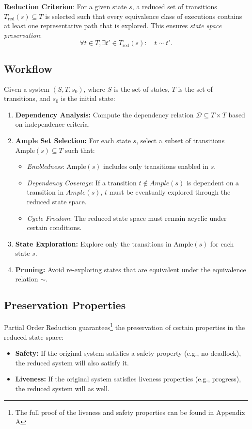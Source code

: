 \textbf{Reduction Criterion}: For a given state \( s \), a reduced set of transitions \( T_{\text{red}}(s) \subseteq T \) is selected such that every equivalence class of executions contains at least one representative path that is explored. This ensures \textit{state space preservation}:
\[
\forall t \in T, \exists t' \in T_{\text{red}}(s): \quad t \sim t'.
\]
\subsection{Workflow}

Given a system \( (S, T, s_0) \), where \( S \) is the set of states, \( T \) is the set of transitions, and \( s_0 \) is the initial state:
\begin{enumerate}
    \item \textbf{Dependency Analysis:} Compute the dependency relation \( \mathcal{D} \subseteq T \times T \) based on independence criteria.
    \item \textbf{Ample Set Selection:} For each state \( s \), select a subset of transitions \( \text{Ample}(s) \subseteq T \) such that:
    \begin{itemize}
        \item \textit{Enabledness}: \( \text{Ample}(s) \) includes only transitions enabled in \( s \).
        \item \textit{Dependency Coverage}: If a transition $t \notin Ample(s)$ is dependent on a transition in $Ample(s)$, $t$ must be eventually explored through the reduced state space.
        \item \textit{Cycle Freedom}: The reduced state space must remain acyclic under certain conditions.
    \end{itemize}
    \item \textbf{State Exploration:} Explore only the transitions in \( \text{Ample}(s) \) for each state \( s \).
    \item \textbf{Pruning:} Avoid re-exploring states that are equivalent under the equivalence relation \( \sim \).
\end{enumerate}

\subsection{Preservation Properties}
Partial Order Reduction guarantees\footnote{The full proof of the liveness and safety properties can be found in Appendix A} the preservation of certain properties in the reduced state space:
\begin{itemize}
    \item \textbf{Safety:} If the original system satisfies a safety property (e.g., no deadlock), the reduced system will also satisfy it.
    \item \textbf{Liveness:} If the original system satisfies liveness properties (e.g., progress), the reduced system will as well.
\end{itemize}

